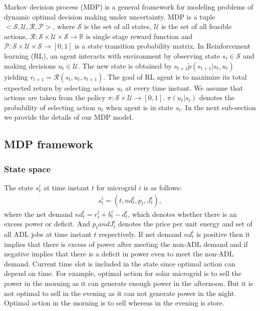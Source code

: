 Markov decision process (MDP)  is a general framework for modeling problems of dynamic optimal decision making under uncertainty. MDP is a tuple $<\mathcal{S},\mathcal{U},\mathcal{R},\mathcal{P}>$, where $\mathcal{S}$ is the set of all states, $\mathcal{U}$ is the set of all feasible actions, $\mathcal{R}:\mathcal{S}\times\mathcal{U}\times\mathcal{S}\to \mathbb{R} $ is single stage reward function and $\mathcal{P}:\mathcal{S}\times\mathcal{U}\times\mathcal{S} \to [0,1]$ is a state transition probability matrix. In Reinforcement learning (RL), an agent interacts with environment by observing state $s_t \in \mathcal{S}$ and  making decisions $u_t \in \mathcal{U}$. The new state is obtained by $s_{t+1} \tilde p(s_{t+1} | s_t,u_t)$ yielding $r_{t+1} = \mathcal{R}(s_t,u_t,s_{t+1})$. The goal of  RL agent is to maximize its total expected return by selecting actions $u_t$ at every time instant. We assume that actions are taken from the policy $\pi : \mathcal{S} \times \mathcal{U} \to [0,1]$. $\pi(u_t | s_t)$ denotes the probability of selecting action $u_t$ when agent is in state $s_t$. 
 In the next sub-section we provide the details of our MDP model.
\subsection{MDP framework}
\subsubsection{State space}
The state $s_{t}^{i}$ at time instant $t$  for microgrid $i$ is as follows:
\begin{align}
s_{t}^{i} = (t,nd_{t}^{i},p_{t}, J_{t}^{i}),
\end{align}
where the net demand $nd_{t}^{i} = r_{t}^{i} + b_{t}^{i} - d_{t}^{i}$, which denotes whether there is an excess power or deficit.  And $p_{t} and  J_{t}^{i}$ denotes the price per unit energy and set of all ADL jobs at time instant $t$ respectively. If  net demand $nd_{t}^{i}$ is positive then it implies that there is excess of power after meeting the non-ADL demand and if negative implies that there is a deficit in power even to meet the non-ADL demand. Current time slot is  included in the state since optimal action can depend on time. For example, optimal action for solar microgrid  is to sell the power in the morning as it can generate enough power in the afternoon. But it is not optimal to sell in the evening as it can not generate power in the night. Optimal action in the morning is to sell whereas in the evening is store.
